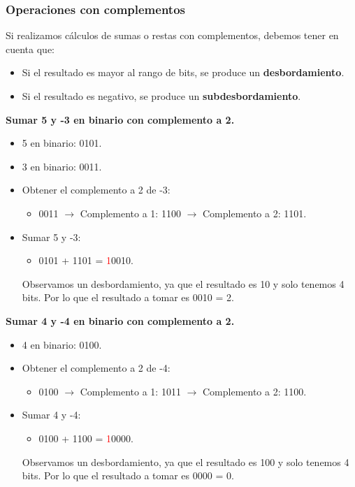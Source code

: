 \documentclass{templateNote}
\begin{document}
\subsubsection{Operaciones con complementos}
Si realizamos cálculos de sumas o restas con complementos, debemos tener en cuenta que:
\begin{itemize}
    \item Si el resultado es mayor al rango de bits, se produce un \textbf{desbordamiento}.
    \item Si el resultado es negativo, se produce un \textbf{subdesbordamiento}.
\end{itemize}
\begin{tcolorbox}[colback=blue!10, colframe=blue!80!black, title={Ejemplo}]
    \textbf{Sumar 5 y -3 en binario con complemento a 2.}
    \begin{itemize}
        \item 5 en binario: 0101.
        \item 3 en binario: 0011.
        \item Obtener el complemento a 2 de -3:
        \begin{itemize}
            \item 0011 $\rightarrow$ Complemento a 1: 1100 $\rightarrow$ Complemento a 2: 1101.
        \end{itemize}
        \item Sumar 5 y -3:
        \begin{itemize}
            \item 0101 + 1101 = \textcolor{red}{1}0010.
        \end{itemize}
        Observamos un desbordamiento, ya que el resultado es 10 y solo tenemos 4 bits. Por lo que el resultado a tomar es 0010 = 2.
    \end{itemize}
    \textbf{Sumar 4 y -4 en binario con complemento a 2.}
    \begin{itemize}
        \item 4 en binario: 0100.
        \item Obtener el complemento a 2 de -4:
        \begin{itemize}
            \item 0100 $\rightarrow$ Complemento a 1: 1011 $\rightarrow$ Complemento a 2: 1100.
        \end{itemize}
        \item Sumar 4 y -4:
        \begin{itemize}
            \item 0100 + 1100 = \textcolor{red}{1}0000.
        \end{itemize}
        Observamos un desbordamiento, ya que el resultado es 100 y solo tenemos 4 bits. Por lo que el resultado a tomar es 0000 = 0.
    \end{itemize}
\end{tcolorbox}
\end{document}
